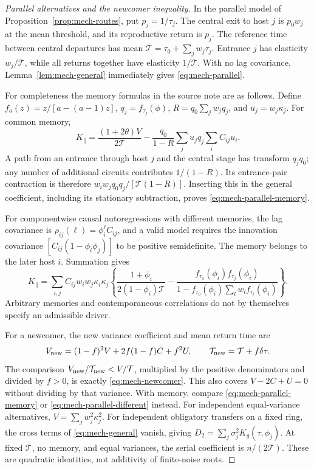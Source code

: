 \begin{proof}[Parallel alternatives and the newcomer inequality]
In the parallel model of Proposition~\ref{prop:mech-routes}, put \(p_j=1/\tau_j\). The central exit to host \(j\) is \(p_0w_j\) at the mean threshold, and its reproductive return is \(p_j\). The reference time between central departures has mean \(\mathcal T=\tau_0+\sum_jw_j\tau_j\). Entrance \(j\) has elasticity \(w_j/\mathcal T\), while all returns together have elasticity \(1/\mathcal T\). With no lag covariance, Lemma~\ref{lem:mech-general} immediately gives \eqref{eq:mech-parallel}.

For completeness the memory formulas in the source note are as follows. Define \(f_a(z)=z/[a-(a-1)z]\), \(q_j=f_{\tau_j}(\phi)\), \(R=q_0\sum_jw_jq_j\), and \(u_j=w_j\kappa_j\). For common memory,
\begin{equation}\label{eq:mech-parallel-memory}
 K_\parallel=\frac{(1+2\theta)V}{2\mathcal T}
 -\frac{q_0}{1-R}\sum_ju_jq_j\sum_iC_{ij}u_i.
\end{equation}
A path from an entrance through host \(j\) and the central stage has transform \(q_jq_0\); any number of additional circuits contributes \(1/(1-R)\). Its entrance-pair contraction is therefore \(w_iw_jq_0q_j/[\mathcal T(1-R)]\). Inserting this in the general coefficient, including its stationary subtraction, proves \eqref{eq:mech-parallel-memory}.

For componentwise causal autoregressions with different memories, the lag covariance is \(\rho_{ij}(\ell)=\phi_i^\ell C_{ij}\), and a valid model requires the innovation covariance \([C_{ij}(1-\phi_i\phi_j)]\) to be positive semidefinite. The memory belongs to the later host \(i\). Summation gives
\begin{equation}\label{eq:mech-parallel-different}
 K_\parallel=\sum_{i,j}C_{ij}w_iw_j\kappa_i\kappa_j
 \left\{\frac{1+\phi_i}{2(1-\phi_i)\mathcal T}
 -\frac{f_{\tau_0}(\phi_i)f_{\tau_j}(\phi_i)}
 {1-f_{\tau_0}(\phi_i)\sum_lw_lf_{\tau_l}(\phi_i)}\right\}.
\end{equation}
Arbitrary memories and contemporaneous correlations do not by themselves specify an admissible driver.

For a newcomer, the new variance coefficient and mean return time are
\[
 V_{\rm new}=(1-f)^2V+2f(1-f)C+f^2U,\qquad
 \mathcal T_{\rm new}=\mathcal T+f\delta\tau.
\]
The comparison \(V_{\rm new}/\mathcal T_{\rm new}<V/\mathcal T\), multiplied by the positive denominators and divided by \(f>0\), is exactly \eqref{eq:mech-newcomer}. This also covers \(V-2C+U=0\) without dividing by that variance. With memory, compare \eqref{eq:mech-parallel-memory} or \eqref{eq:mech-parallel-different} instead. For independent equal-variance alternatives, \(V=\sum_jw_j^2\kappa_j^2\). For independent obligatory transfers on a fixed ring, the cross terms of \eqref{eq:mech-general} vanish, giving \(D_2=\sum_j\sigma_j^2K_g(\tau,\phi_j)\). At fixed \(\mathcal T\), no memory, and equal variances, the serial coefficient is \(n/(2\mathcal T)\). These are quadratic identities, not additivity of finite-noise roots.
\end{proof}

